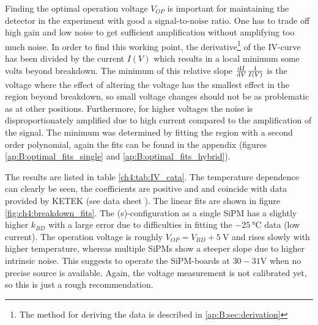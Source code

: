 Finding the optimal operation voltage $V_{OP}$ is important for maintaining the detector in the experiment with good a signal-to-noise ratio. One has to trade off high gain and low noise to get sufficient amplification without amplifying too much noise. In order to find this working point, the derivative\footnote{The method for deriving the data is described in \ref{ap:B:sec:derivation}} of the IV-curve has been divided by the current $I(V)$ which results in a local minimum some volts beyond breakdown. The minimum of this relative slope $\dv{I}{V}\frac{1}{I(V)}$ is the voltage where the effect of altering the voltage has the smallest effect in the region beyond breakdown, so small voltage changes should not be as problematic as at other positions. Furthermore, for higher voltages the noise is disproportionately amplified due to high current compared to the amplification of the signal. The minimum was determined by fitting the region with a second order polynomial, again the fits can be found in the appendix (figures \ref{ap:B:optimal_fits_single} and \ref{ap:B:optimal_fits_hybrid}). \par
The results are listed in table \ref{ch4:tab:IV_cata}. The temperature dependence can clearly be seen, the coefficients are positive and and coincide with data provided by KETEK (see data sheet \cite{ketek}). The linear fits are shown in figure \ref{fig:ch4:breakdown_fits}. The (s)-configuration as a single SiPM has a slightly higher $k_{BD}$ with a large error due to difficulties in fitting the $\SI{-25}{\degreeCelsius}$ data (low current).  The operation voltage is roughly $V_{OP}=V_{BD}+\SI{5}{\volt}$ and rises slowly with higher temperature, whereas multiple SiPMs show a steeper slope due to higher intrinsic noise. This suggests to operate the SiPM-boards at $30-31\si{\volt}$ when no precise source is available. Again, the voltage measurement is not calibrated yet, so this is just a rough recommendation. 

 

